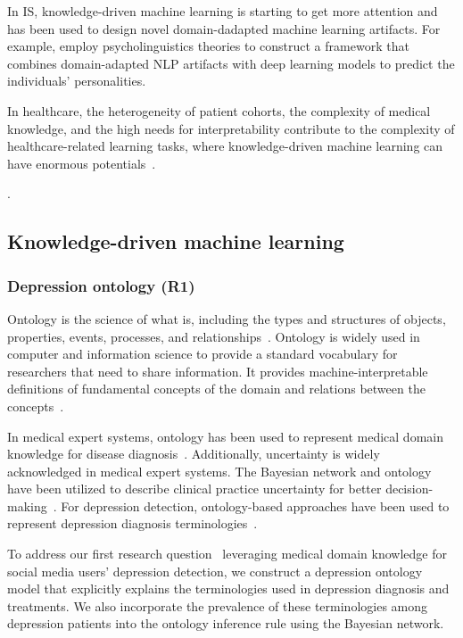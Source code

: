 In IS, knowledge-driven machine learning is starting to get more attention and has been used to design novel domain-dadapted machine learning artifacts. For example, \cite{yang_getting_2022} employ psycholinguistics theories to construct a framework that combines domain-adapted NLP artifacts with deep learning models to predict the individuals' personalities. 

In healthcare, the heterogeneity of patient cohorts, the complexity of medical knowledge, and the high needs for interpretability contribute to the complexity of healthcare-related learning tasks, where knowledge-driven machine learning can have enormous potentials~.

.

\subsection{Knowledge-driven machine learning}\label{sec:related:four}

\subsubsection{Depression ontology (R1)}\label{sec:related:four:r1}

Ontology is the science of what is, including the types and structures of objects, properties, events, processes, and relationships~\citep{smith_ontology_2012}. Ontology is widely used in computer and information science to provide a standard vocabulary for researchers that need to share information. It provides machine-interpretable definitions of fundamental concepts of the domain and relations between the concepts~. 

In medical expert systems, ontology has been used to represent medical domain knowledge for disease diagnosis~\citep{zheng_ontology-based_2008}. Additionally, uncertainty is widely acknowledged in medical expert systems. The Bayesian network and ontology have been utilized to describe clinical practice uncertainty for better decision-making~\citep{zheng_ontology-based_2008}. For depression detection, ontology-based approaches have been used to represent depression diagnosis terminologies~\citep{chang_depression_2013}. 

To address our first research question \textendash~leveraging medical domain knowledge for social media users' depression detection, we construct a depression ontology model that explicitly explains the terminologies used in depression diagnosis and treatments. We also incorporate the prevalence of these terminologies among depression patients into the ontology inference rule using the Bayesian network.

